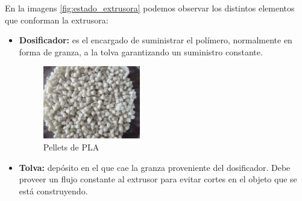 En la imagens \ref{fig:estado_extrusora} podemos observar los distintos elementos que conforman la extrusora:
\begin{itemize}
    \item \textbf{Dosificador:} es el encargado de suministrar el polímero, normalmente en forma de granza, a la tolva garantizando un suministro constante. 
     \begin{figure}[H]
        \centering
        \includegraphics[width=0.4\textwidth]{images/PLA-Pellets.jpg}
        \caption{Pellets de PLA}
        \label{fig:Pellets_PLA}
    \end{figure}
    \item \textbf{Tolva:} depósito en el que cae la granza proveniente del dosificador. Debe proveer un flujo constante al extrusor para evitar cortes en el objeto que se está construyendo.
   

\end{itemize}
